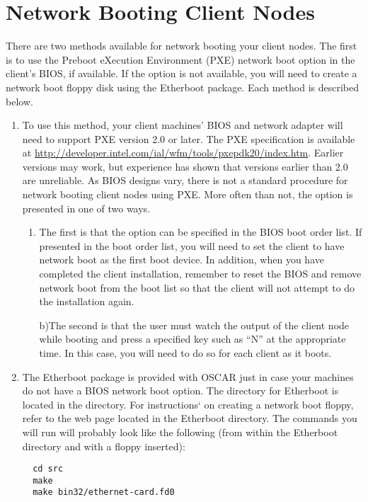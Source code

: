 %
%
%

\section{Network Booting Client Nodes}
\label{app:net-boot-client-nodes}

There are two methods available for network booting your client nodes.
The first is to use the Preboot eXecution Environment (PXE) network
boot option in the client's BIOS, if available. If the option is not
available, you will need to create a network boot floppy disk using
the Etherboot package. Each method is described below.

\begin{enumerate}
\item {} To use this method, your client
  machines' BIOS and network adapter will need to support PXE version
  2.0 or later. The PXE specification is available at
  \url{http://developer.intel.com/ial/wfm/tools/pxepdk20/index.htm}.
  Earlier versions may work, but experience has shown that versions
  earlier than 2.0 are unreliable. As BIOS designs vary, there is not
  a standard procedure for network booting client nodes using PXE.
  More often than not, the option is presented in one of two ways.

  \begin{enumerate}
  \item The first is that the option can be specified in the BIOS boot
    order list. If presented in the boot order list, you will need to
    set the client to have network boot as the first boot device. In
    addition, when you have completed the client installation,
    remember to reset the BIOS and remove network boot from the boot
    list so that the client will not attempt to do the installation
    again.
    
    b)The second is that the user must watch the output of the client
    node while booting and press a specified key such as ``N'' at the
    appropriate time. In this case, you will need to do so for each
    client as it boots.
  \end{enumerate}
  
\item {} The Etherboot
  package is provided with OSCAR just in case your machines do not
  have a BIOS network boot option. The directory for Etherboot is
  located in the  directory. For instructions`
  on creating a network boot floppy, refer to the 
  web page located in the Etherboot directory. The commands you will
  run will probably look like the following (from within the Etherboot
  directory and with a floppy inserted):

\begin{verbatim}
  cd src
  make
  make bin32/ethernet-card.fd0
\end{verbatim}
\end{enumerate}

